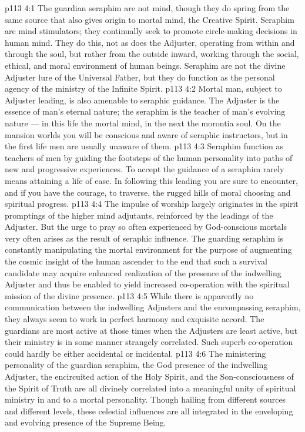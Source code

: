 \vs p113 4:1 The guardian seraphim are not mind, though they do spring from the same source that also gives origin to mortal mind, the Creative Spirit. Seraphim are mind stimulators; they continually seek to promote circle\hyp{}making decisions in human mind. They do this, not as does the Adjuster, operating from within and through the soul, but rather from the outside inward, working through the social, ethical, and moral environment of human beings. Seraphim are not the divine Adjuster lure of the Universal Father, but they do function as the personal agency of the ministry of the Infinite Spirit.
\vs p113 4:2 Mortal man, subject to Adjuster leading, is also amenable to seraphic guidance. The Adjuster is the essence of man’s eternal nature; the seraphim is the teacher of man’s evolving nature --- in this life the mortal mind, in the next the morontia soul. On the mansion worlds you will be conscious and aware of seraphic instructors, but in the first life men are usually unaware of them.
\vs p113 4:3 Seraphim function as teachers of men by guiding the footsteps of the human personality into paths of new and progressive experiences. To accept the guidance of a seraphim rarely means attaining a life of ease. In following this leading you are sure to encounter, and if you have the courage, to traverse, the rugged hills of moral choosing and spiritual progress.
\vs p113 4:4 The impulse of worship largely originates in the spirit promptings of the higher mind adjutants, reinforced by the leadings of the Adjuster. But the urge to pray so often experienced by God\hyp{}conscious mortals very often arises as the result of seraphic influence. The guarding seraphim is constantly manipulating the mortal environment for the purpose of augmenting the cosmic insight of the human ascender to the end that such a survival candidate may acquire enhanced realization of the presence of the indwelling Adjuster and thus be enabled to yield increased co\hyp{}operation with the spiritual mission of the divine presence.
\vs p113 4:5 While there is apparently no communication between the indwelling Adjusters and the encompassing seraphim, they always seem to work in perfect harmony and exquisite accord. The guardians are most active at those times when the Adjusters are least active, but their ministry is in some manner strangely correlated. Such superb co\hyp{}operation could hardly be either accidental or incidental.
\vs p113 4:6 The ministering personality of the guardian seraphim, the God presence of the indwelling Adjuster, the encircuited action of the Holy Spirit, and the Son\hyp{}consciousness of the Spirit of Truth are all divinely correlated into a meaningful unity of spiritual ministry in and to a mortal personality. Though hailing from different sources and different levels, these celestial influences are all integrated in the enveloping and evolving presence of the Supreme Being.
